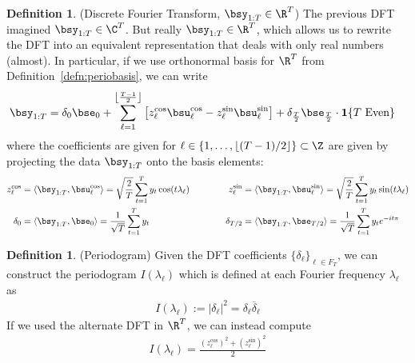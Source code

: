 \documentclass[12pt]{article}
\theoremstyle{plain}
\theoremstyle{definition}
\newtheorem{defn}[thm]{Definition}
\theoremstyle{remark}
\newcommand{\sumtT}{\sum^T_{t=1}}
\begin{document}
\begin{defn}(Discrete Fourier Transform, $\bsy_{1:T}\in\R^T$)
\label{defn:realdft}
The previous DFT imagined $\bsy_{1:T}\in\C^T$.
But really $\bsy_{1:T}\in\R^T$, which allows us to rewrite the DFT into
an equivalent representation that deals with only real numbers (almost).
In particular, if we use orthonormal basis for $\R^T$ from
Definition~\ref{defn:periobasis}, we can write
\begin{align*}
  \bsy_{1:T}
  &=
  \delta_0 \bse_0
  +
  \sum_{\ell=1}^{\left\lfloor \frac{T-1}{2} \right\rfloor}
  \big[
  z_\ell^{\cos}
  \bsu_\ell^{\cos}
  -
  z_\ell^{\sin}
  \bsu_\ell^{\sin}
  \big]
  + \delta_{\frac{T}{2}}\bse_{\frac{T}{2}}
    \cdot\mathbf{1}\{\text{$T$ Even}\}
\end{align*}
where the coefficients are given for
$\ell\in\{1,\ldots,\lfloor (T-1)/2\rfloor\}\subset\Z$
are given by projecting the data $\bsy_{1:T}$ onto the basis elements:
\begin{alignat*}{3}
  z_{\ell}^{\cos}
  &= \langle \bsy_{1:T}, \bsu_{\ell}^{\cos}\rangle
  = \sqrt{\frac{2}{T}}\sum_{t=1}^T y_t\cos(t\lambda_\ell)
  \qquad\quad
  &z_{\ell}^{\sin}
  &= \langle \bsy_{1:T}, \bsu_{\ell}^{\sin}\rangle
  = \sqrt{\frac{2}{T}}\sum_{t=1}^T y_t\sin(t\lambda_\ell)
  \\
  \delta_0
  &= \langle \bsy_{1:T}, \bse_0\rangle
  = \frac{1}{\sqrt{T}} \sumtT y_t
  \qquad
  &\delta_{T/2}
  &= \langle \bsy_{1:T}, \bse_{T/2}\rangle
  = \frac{1}{\sqrt{T}}\sum_{t=1}^T
    y_t e^{-it\pi}
\end{alignat*}
\end{defn}

\begin{defn}(Periodogram)
Given the DFT coefficients $\{\delta_\ell\}_{\ell\in F_T}$, we can
construct the periodogram $I(\lambda_\ell)$ which is defined at each
Fourier frequency $\lambda_\ell$ as
\begin{align*}
  I(\lambda_\ell)
  := |\delta_\ell|^2
  = \delta_\ell \overline{\delta}_\ell
\end{align*}
If we used the alternate DFT in $\R^T$, we can instead compute
\begin{align*}
  I(\lambda_\ell) =
  \frac{\left(z_\ell^{\cos}\right)^2+\left(z_\ell^{\sin}\right)^2}{2}
\end{align*}
\end{defn}
\end{document}
